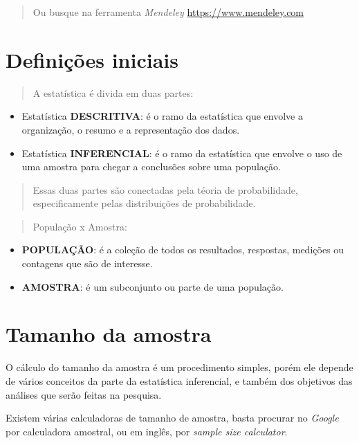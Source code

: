 \documentclass[
]{book}
\begin{document}
\begin{quote}
Ou busque na ferramenta \emph{Mendeley} \url{https://www.mendeley.com}
\end{quote}

\chapter{Definições iniciais}\label{definiuxe7uxf5es-iniciais}

\begin{quote}
A estatística é divida em duas partes:
\end{quote}

\begin{itemize}
\item
  Estatística \textbf{DESCRITIVA}: é o ramo da estatística que envolve a organização, o
  resumo e a representação dos dados.
\item
  Estatística \textbf{INFERENCIAL}: é o ramo da estatística que envolve o uso de uma amostra para chegar a conclusões sobre uma população.
\end{itemize}

\begin{quote}
Essas duas partes são conectadas pela téoria de probabilidade, especificamente pelas distribuições de probabilidade.
\end{quote}

\begin{quote}
População x Amostra:
\end{quote}

\begin{itemize}
\item
  \textbf{POPULAÇÃO}: é a coleção de todos os resultados, respostas, medições ou contagens que são de interesse.
\item
  \textbf{AMOSTRA}: é um subconjunto ou parte de uma população.
\end{itemize}

\chapter{Tamanho da amostra}\label{tamanho-da-amostra}

O cálculo do tamanho da amostra é um procedimento simples, porém ele depende de vários conceitos da parte da estatística inferencial, e também dos objetivos das análises que serão feitas na pesquisa.

Existem várias calculadoras de tamanho de amostra, basta procurar no \emph{Google} por calculadora amostral, ou em inglês, por \emph{sample size calculator}.
\end{document}
